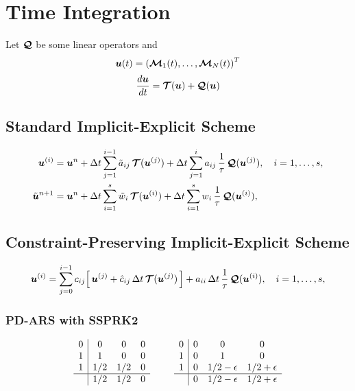 \section{Time Integration}

Let $\vect{\cQ}$ be some linear operators and
\begin{equation}
\vect{u}(t) = \left( \bcM_{1}(t),\ldots,\bcM_{N}(t)\right) ^{T}
\end{equation}
\begin{equation}
  \dfrac{d \vect{u}}{d t} = \vect{\cT}(\vect{u}) + \vect{\cQ}(\vect{u})
\end{equation}
\subsection{Standard Implicit-Explicit Scheme}

\begin{align}
  \vect{u}^{(i)}
  &=\vect{u}^{n}
  +\dt\sum_{j=1}^{i-1}\tilde{a}_{ij}\,\vect{\cT}(\vect{u}^{(j)})
  +\dt\sum_{j=1}^{i}a_{ij}\,\f{1}{\tau}\,\vect{\cQ}(\vect{u}^{(j)}),
  \quad i=1,\ldots,s, \label{imexStages} \\
  \tilde{\vect{u}}^{n+1}
  &=\vect{u}^{n}
  +\dt\sum_{i=1}^{s}\tilde{w}_{i}\,\vect{\cT}(\vect{u}^{(i)})
  +\dt\sum_{i=1}^{s}w_{i}\,\f{1}{\tau}\,\vect{\cQ}(\vect{u}^{(i)}), \label{imexIntermediate} 
\end{align}

\subsection{Constraint-Preserving Implicit-Explicit Scheme}

\begin{equation}
  \vect{u}^{(i)}
  =\sum_{j=0}^{i-1}c_{ij}\Big[\,\vect{u}^{(j)}+\hat{c}_{ij}\,\dt\,\vect{\cT}(\vect{u}^{(j)})\,\Big]
  +a_{ii}\,\dt\,\f{1}{\tau}\,\vect{\cQ}(\vect{u}^{(i)}),\quad i=1,\ldots,s,
  \label{eq:imexStagesRewrite}
\end{equation}

\subsubsection{PD-ARS with SSPRK2}

\begin{equation}
  \begin{array}{c | c c c}
  	0 & 0   & 0 & 0 \\
  	1 & 1   & 0 & 0 \\
  	1 & 1/2 & 1/2 & 0 \\ \hline
  	  & 1/2 & 1/2 & 0
  \end{array}
  \qquad
  \begin{array}{c | c c c}
  	0 & 0 & 0            & 0            \\
  	1 & 0 & 1            & 0            \\
  	1 & 0 & 1/2-\epsilon & 1/2+\epsilon \\ \hline
  	  & 0 & 1/2-\epsilon & 1/2+\epsilon
  \end{array}
\end{equation}

